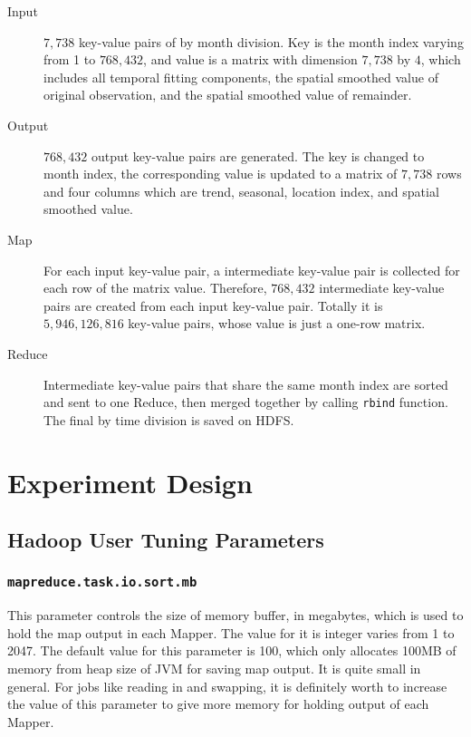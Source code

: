 \begin{description}
\item[Input] $7,738$ key-value pairs of by month division. Key is the month 
index varying from 1 to $768,432$, and value is a matrix with dimension $7,738$ 
by $4$, which includes all temporal fitting components, the spatial smoothed value
of original observation, and the spatial smoothed value of remainder.
\item[Output] $768,432$ output key-value pairs are generated. The key is changed
to month index, the corresponding value is updated to a matrix of $7,738$ rows 
and four columns which are trend, seasonal, location index, and spatial smoothed 
value. 
\item[Map] For each input key-value pair, a intermediate key-value pair is 
collected for each row of the matrix value. Therefore, $768,432$ intermediate
key-value pairs are created from each input key-value pair. Totally it is 
$5,946,126,816$ key-value pairs, whose value is just a one-row matrix.
\item[Reduce] Intermediate key-value pairs that share the same month index are 
sorted and sent to one Reduce, then merged together by calling \texttt{rbind}
function. The final by time division is saved on HDFS.
\end{description}

\section{Experiment Design}

\subsection{Hadoop User Tuning Parameters}

\subsubsection{\texttt{mapreduce.task.io.sort.mb}}

This parameter controls the size of memory buffer, in megabytes, which is used 
to hold the map output in each Mapper. The value for it is integer varies from 1 
to 2047. The default value for this parameter is 100, which only allocates 100MB
of memory from heap size of JVM for saving map output. It is quite small in 
general. For jobs like reading in and swapping, it is definitely worth to increase
the value of this parameter to give more memory for holding output of each Mapper.

